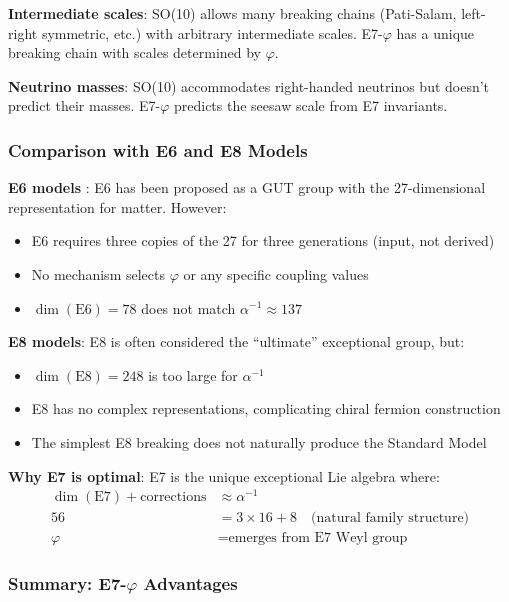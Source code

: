 \documentclass[11pt,a4paper]{article}
\begin{document}
\textbf{Intermediate scales}: SO(10) allows many breaking chains (Pati-Salam, left-right symmetric, etc.) with arbitrary intermediate scales. E7-$\varphi$ has a unique breaking chain with scales determined by $\varphi$.

\textbf{Neutrino masses}: SO(10) accommodates right-handed neutrinos but doesn't predict their masses. E7-$\varphi$ predicts the seesaw scale from E7 invariants.

\subsubsection{Comparison with E6 and E8 Models}

\textbf{E6 models} \cite{Lisi2007}: E6 has been proposed as a GUT group with the 27-dimensional representation for matter. However:
\begin{itemize}
\item E6 requires three copies of the 27 for three generations (input, not derived)
\item No mechanism selects $\varphi$ or any specific coupling values
\item $\dim(\text{E6}) = 78$ does not match $\alpha^{-1} \approx 137$
\end{itemize}

\textbf{E8 models}: E8 is often considered the ``ultimate'' exceptional group, but:
\begin{itemize}
\item $\dim(\text{E8}) = 248$ is too large for $\alpha^{-1}$
\item E8 has no complex representations, complicating chiral fermion construction \cite{Distler2010}
\item The simplest E8 breaking does not naturally produce the Standard Model
\end{itemize}

\textbf{Why E7 is optimal}: E7 is the unique exceptional Lie algebra where:
\begin{align}
\dim(\text{E7}) + \text{corrections} &\approx \alpha^{-1} \\
56 &= 3 \times 16 + 8 \quad \text{(natural family structure)} \\
\varphi &= \text{emerges from E7 Weyl group}
\end{align}

\subsubsection{Summary: E7-$\varphi$ Advantages}
\end{document}
